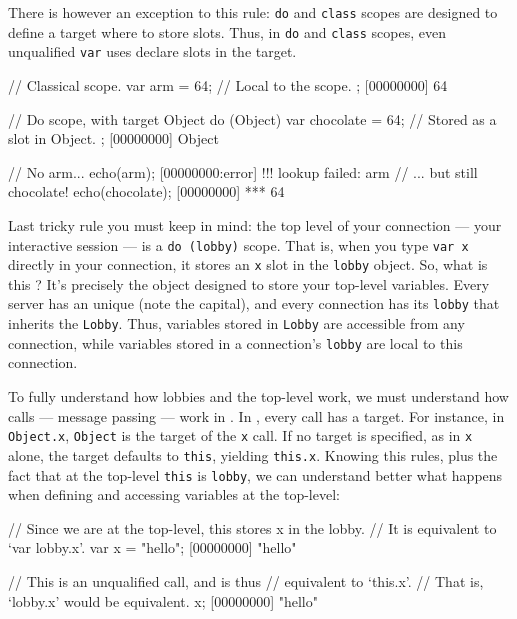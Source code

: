 There is however an exception to this rule: \lstinline|do| and
\lstinline|class| scopes are designed to define a target where to
store slots. Thus, in \lstinline|do| and \lstinline|class| scopes,
even unqualified \lstinline|var| uses declare slots in the target.

\begin{urbiscript}
// Classical scope.
{
  var arm = 64; // Local to the scope.
};
[00000000] 64

// Do scope, with target Object
do (Object)
{
  var chocolate = 64; // Stored as a slot in Object.
};
[00000000] Object

// No arm...
echo(arm);
[00000000:error] !!! lookup failed: arm
// ... but still chocolate!
echo(chocolate);
[00000000] *** 64
\end{urbiscript}

Last tricky rule you must keep in mind: the top level of your
connection --- your interactive session --- is a %
\lstinline|do (lobby)| scope. That is, when you type \lstinline|var x|
directly in your connection, it stores an \lstinline|x| slot in the
\lstinline|lobby| object. So, what is this ? It's precisely
the object designed to store your top-level variables. Every \urbi
server has an unique  (note the capital), and every
connection has its \lstinline|lobby| that inherits the
\lstinline|Lobby|. Thus, variables stored in \lstinline|Lobby| are
accessible from any connection, while variables stored in a
connection's \lstinline|lobby| are local to this connection.

To fully understand how lobbies and the top-level work, we must
understand how calls --- message passing --- work in \us.  In \us,
every call has a target. For instance, in \lstinline|Object.x|,
\lstinline|Object| is the target of the \lstinline|x| call. If no
target is specified, as in \lstinline|x| alone, the target defaults to
\lstinline|this|, yielding \lstinline|this.x|. Knowing this rules,
plus the fact that at the top-level \lstinline|this| is
\lstinline|lobby|, we can understand better what happens when defining
and accessing variables at the top-level:

\begin{urbiscript}
// Since we are at the top-level, this stores x in the lobby.
// It is equivalent to `var lobby.x'.
var x = "hello";
[00000000] "hello"

// This is an unqualified call, and is thus
// equivalent to `this.x'.
// That is, `lobby.x' would be equivalent.
x;
[00000000] "hello"
\end{urbiscript}

